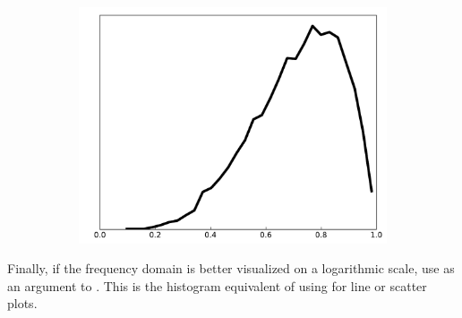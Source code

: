 \begin{figure}[H]
\begin{subfigure}{.325\textwidth}
    \includegraphics[width=\linewidth]{figures/histogram_4.pdf}
\end{subfigure}
\end{figure}

Finally, if the frequency domain is better visualized on a logarithmic scale, use  as an argument to .
This is the histogram equivalent of using  for line or scatter plots.

